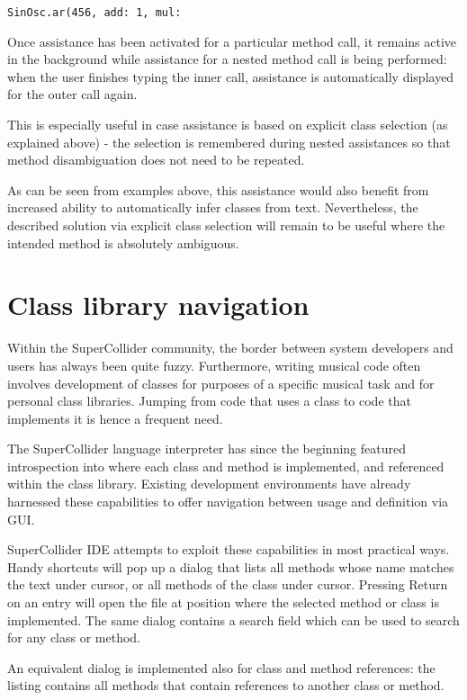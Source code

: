 \documentclass[11pt,a4paper]{article}
\begin{document}
\verb|SinOsc.ar(456, add: 1, mul:|

Once assistance has been activated for a particular method call, it remains active in the
background while assistance for a nested method call is being performed: when the user
finishes typing the inner call, assistance is automatically displayed for the outer call again.

This is especially useful in case assistance is based on explicit class selection (as explained
above) - the selection is remembered during nested assistances so that method disambiguation does
not need to be repeated.

As can be seen from examples above, this assistance would also benefit from increased ability to
automatically infer classes from text. Nevertheless, the described solution via explicit class
selection will remain to be useful where the intended method is absolutely ambiguous.

\section{Class library navigation}
\label{class-lib-lookup}

Within the SuperCollider community, the border between system developers and users has always been
quite fuzzy. Furthermore, writing musical code often involves development of classes for purposes of
a specific musical task and for personal class libraries. Jumping from code that uses a class to
code that implements it is hence a frequent need.

The SuperCollider language interpreter has since the beginning featured introspection into where
each class and method is implemented, and referenced within the class library. Existing development
environments have already harnessed these capabilities to offer navigation between usage and
definition via GUI.

SuperCollider IDE attempts to exploit these capabilities in most practical ways. Handy shortcuts
will pop up a dialog that lists all methods whose name matches the text under cursor, or all methods
of the class under cursor. Pressing Return on an entry will open the file at position where the
selected method or class is implemented. The same dialog contains a search field which can be used
to search for any class or method.

An equivalent dialog is implemented also for class and method references: the listing contains
all methods that contain references to another class or method.
\end{document}
